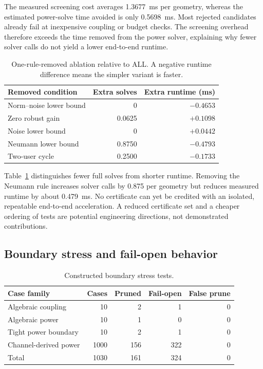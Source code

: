 \documentclass[journal]{IEEEtran}
\begin{document}
The measured screening cost averages 1.3677~ms per geometry, whereas the estimated power-solve time avoided is only 0.5698~ms. Most rejected candidates already fail at inexpensive coupling or budget checks. The screening overhead therefore exceeds the time removed from the power solver, explaining why fewer solver calls do not yield a lower end-to-end runtime.

\begin{table}[t]
\caption{One-rule-removed ablation relative to ALL. A negative runtime difference means the simpler variant is faster.}
\label{tab:ablation}
\centering\footnotesize
\begin{tabular}{lrr}
\toprule
Removed condition & Extra solves & Extra runtime (ms)\\
\midrule
Norm--noise lower bound & 0 & $-0.4653$\\
Zero robust gain & 0.0625 & $+0.1098$\\
Noise lower bound & 0 & $+0.0442$\\
Neumann lower bound & 0.8750 & $-0.4793$\\
Two-user cycle & 0.2500 & $-0.1733$\\
\bottomrule
\end{tabular}
\end{table}

Table~\ref{tab:ablation} distinguishes fewer full solves from shorter runtime. Removing the Neumann rule increases solver calls by 0.875 per geometry but reduces measured runtime by about 0.479~ms. No certificate can yet be credited with an isolated, repeatable end-to-end acceleration. A reduced certificate set and a cheaper ordering of tests are potential engineering directions, not demonstrated contributions.

\subsection{Boundary stress and fail-open behavior}
\begin{table}[t]
\caption{Constructed boundary stress tests.}
\label{tab:boundary}
\centering\footnotesize
\begin{tabular}{lrrrr}
\toprule
Case family & Cases & Pruned & Fail-open & False prune\\
\midrule
Algebraic coupling & 10 & 2 & 1 & 0\\
Algebraic power & 10 & 1 & 0 & 0\\
Tight power boundary & 10 & 2 & 1 & 0\\
Channel-derived power & 1000 & 156 & 322 & 0\\
\midrule
Total & 1030 & 161 & 324 & 0\\
\bottomrule
\end{tabular}
\end{table}
\end{document}
